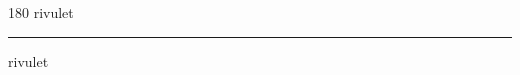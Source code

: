 
\begin{frame}
\begin{center}
\begin{turn}{180}
{\fontsize{2.5cm}{1em}\selectfont rivulet}
\end{turn}
\vspace{1em}\par  
\hrule
\vspace{1em}\par  
{\fontsize{2.5cm}{1em}\selectfont rivulet}
\end{center}
\end{frame}
